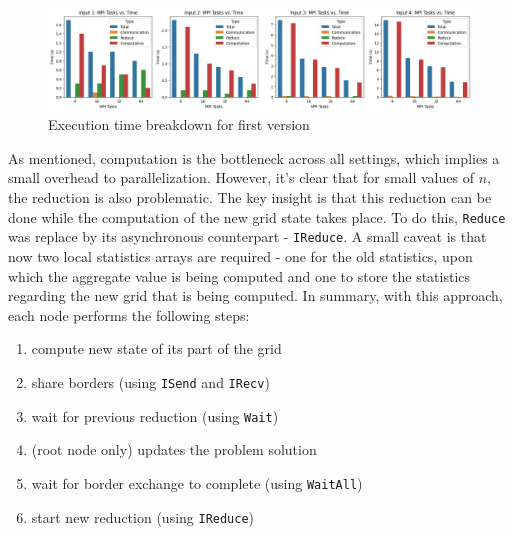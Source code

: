 \documentclass{article}
\begin{document}
\begin{figure}[htbp]
    \centering
    \includegraphics[width=1\textwidth]{img/first-version-breakdown.png}
    \caption{Execution time breakdown for first version}
    \label{time-breakdown}
\end{figure}

As mentioned, computation is the bottleneck across all settings, which implies a small
overhead to parallelization. However, it's
clear that for small values of $n$, the reduction is also problematic. The key insight
is that this reduction can be done while the computation of the new grid state takes place.
To do this, \texttt{Reduce} was 
replace by its asynchronous counterpart - \texttt{IReduce}. A small caveat is that
now two local statistics arrays are required - one for the old statistics, upon which
the aggregate value is being computed and one to store
the statistics regarding the new grid that is being computed. In summary, with this approach,
each node performs the following steps:

\begin{enumerate}
	\itemsep -0.2em
	\item compute new state of its part of the grid
	\item share borders (using \texttt{ISend} and \texttt{IRecv})
	\item wait for previous reduction (using \texttt{Wait})
	\item (root node only) updates the problem solution
	\item wait for border exchange to complete (using \texttt{WaitAll})
	\item start new reduction (using \texttt{IReduce})
\end{enumerate}

\end{document}
